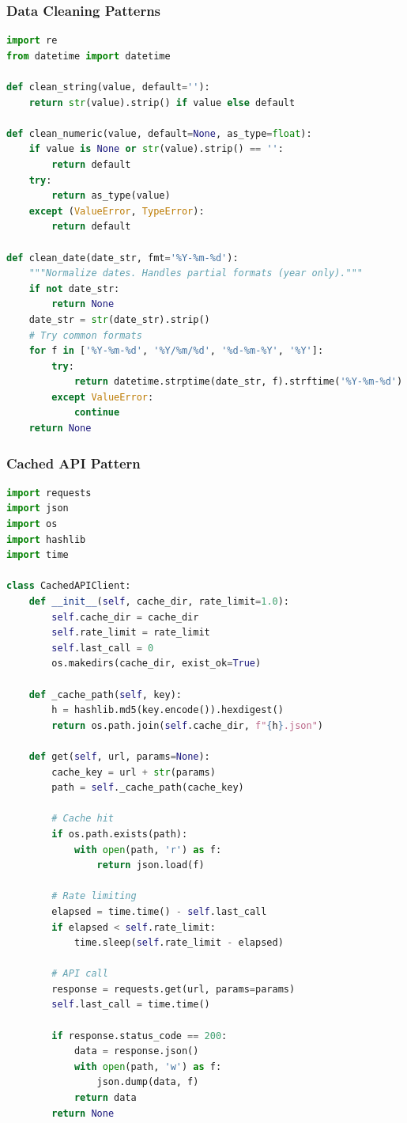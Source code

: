 \subsubsection{Data Cleaning Patterns}
\label{subsec:data-cleaning-patterns}

\begin{lstlisting}[language=Python]
import re
from datetime import datetime

def clean_string(value, default=''):
    return str(value).strip() if value else default

def clean_numeric(value, default=None, as_type=float):
    if value is None or str(value).strip() == '':
        return default
    try:
        return as_type(value)
    except (ValueError, TypeError):
        return default

def clean_date(date_str, fmt='%Y-%m-%d'):
    """Normalize dates. Handles partial formats (year only)."""
    if not date_str:
        return None
    date_str = str(date_str).strip()
    # Try common formats
    for f in ['%Y-%m-%d', '%Y/%m/%d', '%d-%m-%Y', '%Y']:
        try:
            return datetime.strptime(date_str, f).strftime('%Y-%m-%d')
        except ValueError:
            continue
    return None
\end{lstlisting}

\subsubsection{Cached API Pattern}
\label{subsec:api-cache-pattern}

\begin{lstlisting}[language=Python]
import requests
import json
import os
import hashlib
import time

class CachedAPIClient:
    def __init__(self, cache_dir, rate_limit=1.0):
        self.cache_dir = cache_dir
        self.rate_limit = rate_limit
        self.last_call = 0
        os.makedirs(cache_dir, exist_ok=True)

    def _cache_path(self, key):
        h = hashlib.md5(key.encode()).hexdigest()
        return os.path.join(self.cache_dir, f"{h}.json")

    def get(self, url, params=None):
        cache_key = url + str(params)
        path = self._cache_path(cache_key)

        # Cache hit
        if os.path.exists(path):
            with open(path, 'r') as f:
                return json.load(f)

        # Rate limiting
        elapsed = time.time() - self.last_call
        if elapsed < self.rate_limit:
            time.sleep(self.rate_limit - elapsed)

        # API call
        response = requests.get(url, params=params)
        self.last_call = time.time()

        if response.status_code == 200:
            data = response.json()
            with open(path, 'w') as f:
                json.dump(data, f)
            return data
        return None
\end{lstlisting}
